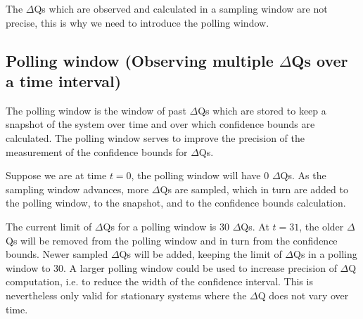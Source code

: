     The $\Delta$Qs which are observed and calculated in a sampling window are not precise, this is why we need to introduce the polling window.

    \subsection{Polling window (Observing multiple $\Delta$Qs over a time interval)}
        The polling window is the window of past $\Delta$Qs which are stored to keep a snapshot of the system over time and over which confidence bounds are calculated. The polling window serves to improve the precision of the measurement of the confidence bounds for $\Delta$Qs.
        
        Suppose we are at time $t = 0$, the polling window will have 0 $\Delta$Qs. As the sampling window advances, more $\Delta$Qs are sampled, which in turn are added to the polling window, to the snapshot, and to the confidence bounds calculation.

        The current limit of $\Delta$Qs for a polling window is 30 $\Delta$Qs. At $t = 31$, the older $\Delta$Qs will be removed from the polling window and in turn from the confidence bounds. Newer sampled $\Delta$Qs will be added, keeping the limit of $\Delta$Qs in a polling window to 30. A larger polling window could be used to increase precision of $\Delta$Q computation, i.e. to reduce the width of the confidence interval. This is nevertheless only valid for stationary systems where the $\Delta$Q does not vary over time.


